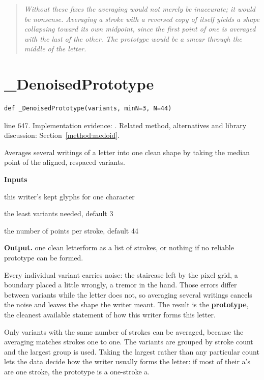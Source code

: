 \begin{quote}\small\itshape Without these fixes the averaging would not merely be inaccurate; it would be nonsense. Averaging a stroke with a reversed copy of itself yields a shape collapsing toward its own midpoint, since the first point of one is averaged with the last of the other. The prototype would be a smear through the middle of the letter.\end{quote}


\section{\_DenoisedPrototype}\label{fn:style:-DenoisedPrototype}
\begin{lstlisting}[style=sig]
def _DenoisedPrototype(variants, minN=3, N=44)
\end{lstlisting}
 line 647. Implementation evidence: \cite{code2026}. Related method, alternatives and library discussion: Section~\ref{method:medoid}.


Averages several writings of a letter into one clean shape by taking the median point of the aligned, respaced variants.




\noindent\textbf{Inputs}
\begin{description}[leftmargin=2.2em,style=nextline,font=\normalfont\ttfamily]\setlength\itemsep{1pt}
  \item[{variants}] \normalfont this writer's kept glyphs for one character
  \item[{minN}] \normalfont the least variants needed, default 3
  \item[{N}] \normalfont the number of points per stroke, default 44
\end{description}

\noindent\textbf{Output.} one clean letterform as a list of strokes, or nothing if no reliable prototype can be formed.


Every individual variant carries noise: the staircase left by the pixel grid, a boundary placed a little wrongly, a tremor in the hand. Those errors differ between variants while the letter does not, so averaging several writings cancels the noise and leaves the shape the writer meant. The result is the \textbf{prototype}, the cleanest available statement of how this writer forms this letter.


Only variants with the same number of strokes can be averaged, because the averaging matches strokes one to one. The variants are grouped by stroke count and the largest group is used. Taking the largest rather than any particular count lets the data decide how the writer usually forms the letter: if most of their a's are one stroke, the prototype is a one-stroke a.

